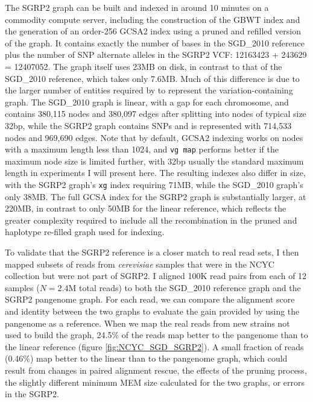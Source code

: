 \documentclass[a4paper,12pt,numbered,oneside]{Classes/PhDThesisPSnPDF}
\begin{document}
The SGRP2 graph can be built and indexed in around 10 minutes on a commodity compute server, including the construction of the GBWT index and the generation of an order-256 GCSA2 index using a pruned and refilled version of the graph.
It contains exactly the number of bases in the SGD\_2010 reference plus the number of SNP alternate alleles in the SGRP2 VCF: 12163423 + 243629 = 12407052.
The graph itself uses 23MB on disk, in contrast to that of the SGD\_2010 reference, which takes only 7.6MB.
Much of this difference is due to the larger number of entities required by to represent the variation-containing graph.
The SGD\_2010 graph is linear, with a gap for each chromosome, and contains 380,115 nodes and 380,097 edges after splitting into nodes of typical size 32bp, while the SGRP2 graph contains SNPs and is represented with 714,533 nodes and 969,690 edges.
Note that by default, GCSA2 indexing works on nodes with a maximum length less than 1024, and {\tt vg map} performs better if the maximum node size is limited further, with 32bp usually the standard maximum length in experiments I will present here.
The resulting indexes also differ in size, with the SGRP2 graph's {\tt xg} index requiring 71MB, while the SGD\_2010 graph's only 38MB.
The full GCSA index for the SGRP2 graph is substantially larger, at 220MB, in contrast to only 50MB for the linear reference, which reflects the greater complexity required to include all the recombination in the pruned and haplotype re-filled graph used for indexing.

To validate that the SGRP2 reference is a closer match to real read sets, I then mapped subsets of reads from \emph{cerevisiae} samples that were in the NCYC collection but were not part of SGRP2.
I aligned 100K read pairs from each of 12 samples ($N=2.4$M total reads) to both the SGD\_2010 reference graph and the SGRP2 pangenome graph.
For each read, we can compare the alignment score and identity between the two graphs to evaluate the gain provided by using the pangenome as a reference.
When we map the real reads from new strains not used to build the graph, 24.5\% of the reads map better to the pangenome than to the linear reference (figure \ref{fig:NCYC_SGD_SGRP2}).
A small fraction of reads (0.46\%) map better to the linear than to the pangenome graph, which could result from changes in paired alignment rescue, the effects of the pruning process, the slightly different minimum MEM size calculated for the two graphs, or errors in the SGRP2.
\end{document}
